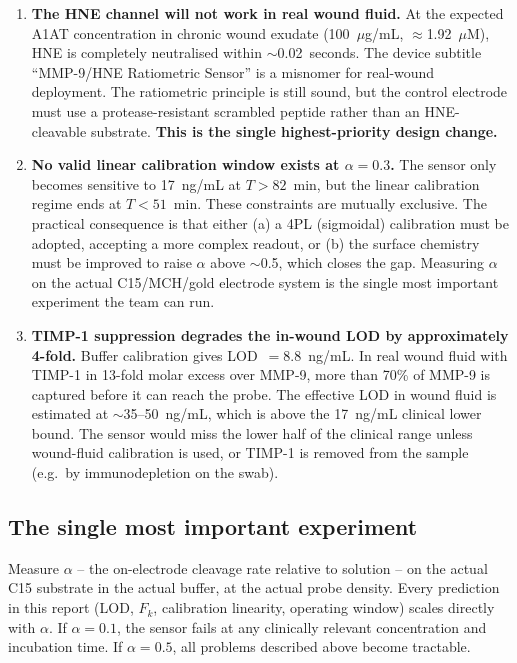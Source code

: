 \documentclass[10pt,a4paper]{article}
\begin{document}
\begin{enumerate}
\item \textbf{The HNE channel will not work in real wound fluid.} At the expected A1AT
  concentration in chronic wound exudate (100~$\mu$g/mL, $\approx$1.92~$\mu$M), HNE is
  completely neutralised within $\sim$0.02~seconds. The device subtitle ``MMP-9/HNE Ratiometric
  Sensor'' is a misnomer for real-wound deployment. The ratiometric principle is still sound,
  but the control electrode must use a protease-resistant scrambled peptide rather than an
  HNE-cleavable substrate. \textbf{This is the single highest-priority design change.}

\item \textbf{No valid linear calibration window exists at $\alpha = 0.3$.} The sensor only
  becomes sensitive to 17~ng/mL at $T > 82$~min, but the linear calibration regime ends at
  $T < 51$~min. These constraints are mutually exclusive. The practical consequence is that
  either (a) a 4PL (sigmoidal) calibration must be adopted, accepting a more complex readout,
  or (b) the surface chemistry must be improved to raise $\alpha$ above $\sim$0.5, which closes
  the gap. Measuring $\alpha$ on the actual C15/MCH/gold electrode system is the single most
  important experiment the team can run.

\item \textbf{TIMP-1 suppression degrades the in-wound LOD by approximately 4-fold.} Buffer
  calibration gives LOD~$= 8.8$~ng/mL. In real wound fluid with TIMP-1 in 13-fold molar
  excess over MMP-9, more than 70\% of MMP-9 is captured before it can reach the probe.
  The effective LOD in wound fluid is estimated at $\sim$35--50~ng/mL, which is above the
  17~ng/mL clinical lower bound. The sensor would miss the lower half of the clinical range
  unless wound-fluid calibration is used, or TIMP-1 is removed from the sample (e.g.\ by
  immunodepletion on the swab).
\end{enumerate}

\subsection{The single most important experiment}

Measure $\alpha$ -- the on-electrode cleavage rate relative to solution -- on the actual C15
substrate in the actual buffer, at the actual probe density. Every prediction in this report
(LOD, $F_k$, calibration linearity, operating window) scales directly with $\alpha$. If
$\alpha = 0.1$, the sensor fails at any clinically relevant concentration and incubation time.
If $\alpha = 0.5$, all problems described above become tractable.
\end{document}
